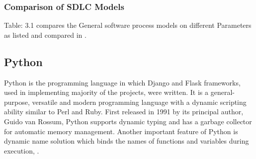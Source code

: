 \subsubsection{Comparison of \ac{SDLC} Models}
Table: 3.1 compares the General software process models on different Parameters as listed and compared in \citet{Sharma:2015}.
\begin{table}[htbp]
	\caption{ Comparison of various \ac{SDLC} Models on different Parameters}
	\label{Table: 3.1}
\end{table}
\subsection{Python}
Python is the programming language in which Django and Flask frameworks, used in implementing majority of the projects, were written. It is a general-purpose, versatile and modern programming language with a dynamic scripting ability similar to Perl and Ruby. First released in 1991 by its principal author, Guido van Rossum, Python supports dynamic typing and has a garbage collector for automatic memory management. Another important feature of Python is dynamic name solution which binds the names of functions and variables during execution, \citet{Zhou:2010}.
